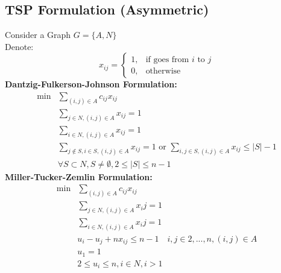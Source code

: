 			\subsection{TSP Formulation (Asymmetric)}
				Consider a Graph $G=\{A, N\}$\\
				Denote:\\
				\begin{equation}
					x_{ij} = \begin{cases}1, &\text{if goes from } i \text{ to } j\\ 0, & \text{otherwise}\end{cases}
				\end{equation}
				\textbf{Dantzig-Fulkerson-Johnson Formulation:}
				\begin{align}
					\min &\sum_{(i, j)\in A} c_{ij}x_{ij} \\
					& \sum_{j \in N, (i,j)\in A} x_{ij} = 1 \\
					& \sum_{i \in N, (i,j)\in A} x_{ij} = 1 \\
					& \sum_{j\notin S, i\in S, (i,j)\in A} x_{ij} = 1\text{ or } \sum_{i, j \in S, (i, j) \in A} x_{ij} \le |S| - 1 \\
					& \forall S \subset N, S\ne \emptyset, 2\le |S| \le n-1 
				\end{align}
				\textbf{Miller-Tucker-Zemlin Formulation:}
				\begin{align}
					\min &\sum_{(i, j)\in A} c_{ij}x_{ij} \\
					& \sum_{j \in N, (i,j)\in A} x_ij = 1 \\
					& \sum_{i \in N, (i,j)\in A} x_ij = 1 \\
					& u_i - u_j +nx_{ij}\le n-1 \quad i, j\in{2, ... , n}, (i, j)\in A \\
					& u_1 = 1 \\
					& 2 \le u_i \le n, i\in N, i>1 
				\end{align}

